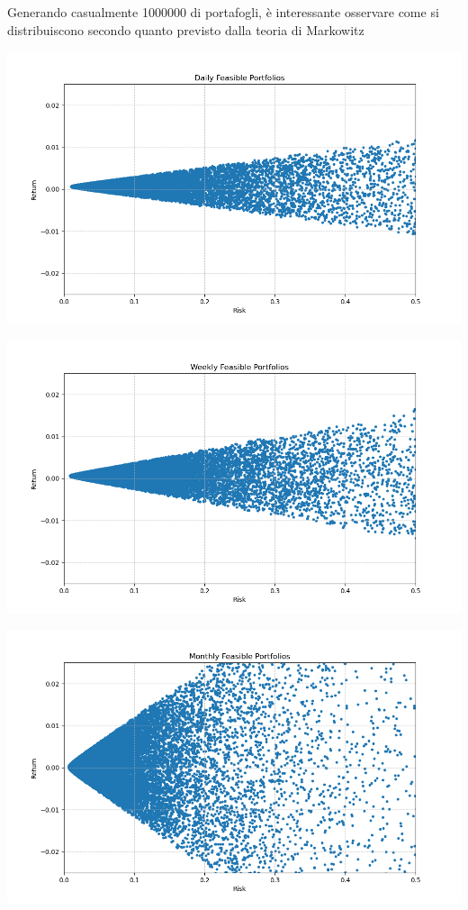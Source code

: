 \documentclass[compress]{beamer}
\begin{document}
\begin{frame}{\subsecname}
	Generando casualmente 1000000 di portafogli, è interessante osservare come si distribuiscono secondo quanto previsto dalla teoria di Markowitz \\
	\vspace{-0.6cm}
	\begin{minipage}{0.49\textwidth}
		\centering
		\includegraphics[width=1\linewidth]{images/Daily Feasible Portfolios.png}
	\end{minipage}
	\hfill
	\begin{minipage}{0.49\textwidth}
		\centering
		\includegraphics[width=1\linewidth]{images/Weekly Feasible Portfolios.png}
	\end{minipage}
	\vspace{0.13cm}
	\begin{center}
		\begin{minipage}{0.5\textwidth}
			\centering
			\includegraphics[width=0.95\linewidth]{images/Monthly Feasible Portfolios.png}

\end{minipage}
\end{center}
\end{frame}
\end{document}
